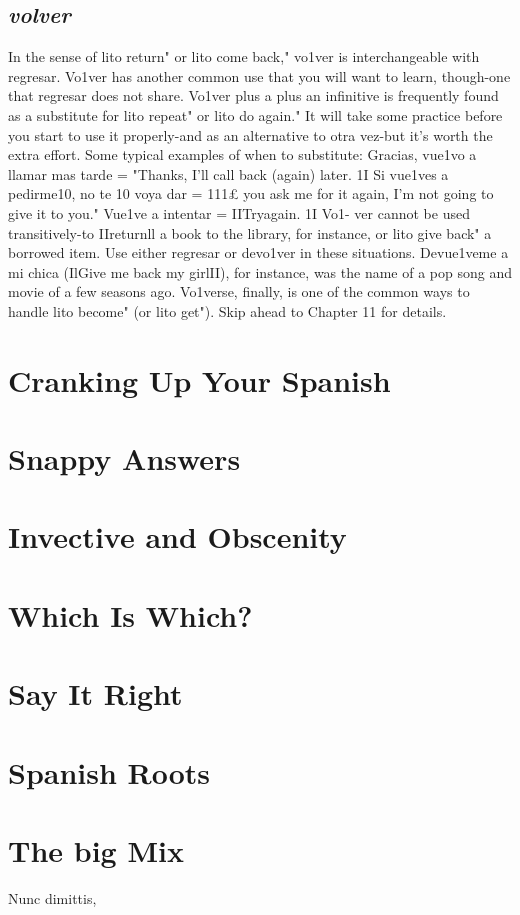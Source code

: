 \documentclass[14pt,a4paper,oneside]{memoir}
\begin{document}
\section{\emph{volver}}

In the sense of lito return" or lito come back," vo1ver is interchangeable with regresar. Vo1ver has another common use that you
will want to learn, though-one that regresar does not share. Vo1ver
plus a plus an infinitive is frequently found as a substitute for lito repeat" or lito do again." It will take some practice before you start to
use it properly-and as an alternative to otra vez-but it's worth the
extra effort. Some typical examples of when to substitute: Gracias,
vue1vo a llamar mas tarde = "Thanks, I'll call back (again) later. 1I Si
vue1ves a pedirme10, no te 10 voya dar = 111£ you ask me for it again,
I'm not going to give it to you." Vue1ve a intentar = IITryagain. 1I Vo1-
ver cannot be used transitively-to IIreturnll a book to the library, for
instance, or lito give back" a borrowed item. Use either regresar or devo1ver in these situations. Devue1veme a mi chica (IlGive me back my
girlII), for instance, was the name of a pop song and movie of a few seasons ago. Vo1verse, finally, is one of the common ways to handle lito
become" (or lito get"). Skip ahead to Chapter 11 for details.

\chapter{Cranking Up Your Spanish}

\chapter{Snappy Answers}

\chapter{Invective and Obscenity}

\chapter{Which Is Which?}

\chapter{Say It Right}

\chapter{Spanish Roots}

\chapter{The big Mix}


\begin{flushright}
    {\tiny{Nunc dimittis}, \DTMnow}
\end{flushright}
\end{document}
